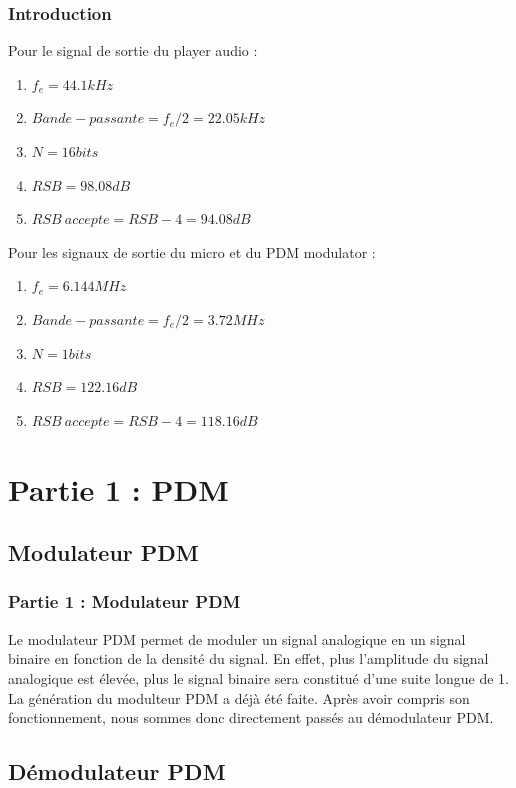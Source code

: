 \documentclass[
10pt,
aspectratio=169,
]{beamer}
\begin{document}
\begin{frame} 
\frametitle{Introduction} 
Pour le signal de sortie du player audio : 
\begin{enumerate} 
\item $f_e = 44.1 kHz$
\item $Bande-passante = f_e/2 = 22.05 kHz$
\item $N = 16 bits$
\item $RSB = 98.08 dB$
\item $RSB ~accepte = RSB - 4 = 94.08 dB$
\end{enumerate}
\vspace*{0.7cm}
Pour les signaux de sortie du micro et du PDM modulator : 
\begin{enumerate} 
\item $f_e = 6.144 MHz$
\item $Bande-passante = f_e/2 = 3.72 MHz$
\item $N = 1 bits$
\item $RSB = 122.16 dB$
\item $RSB~accepte = RSB - 4 = 118.16 dB$
\end{enumerate}
\end{frame}

\section{Partie 1 : PDM}
\subsection{Modulateur PDM}
\begin{frame} 
\frametitle{Partie 1 : Modulateur PDM} 
Le modulateur PDM permet de moduler un signal analogique en un signal binaire en fonction de la densité du signal. En effet, plus l'amplitude du signal analogique est élevée, plus le signal binaire sera constitué d'une suite longue de 1.\\
\vspace*{0.3cm}
La génération du modulteur PDM a déjà été faite. Après avoir compris son fonctionnement, nous sommes donc directement passés au démodulateur PDM.
\end{frame}

\subsection{Démodulateur PDM}
\end{document}
